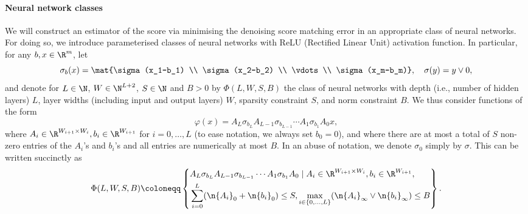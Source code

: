 \documentclass[a4paper, 11pt, headings = small, abstract]{scrartcl}
\begin{document}
\paragraph{Neural network classes} 
We will construct an estimator of the score via minimising the denoising score matching error in an appropriate class of neural networks. For doing so, we introduce  parameterised classes of neural networks with ReLU (Rectified Linear Unit) activation function. 
In particular, for any $b, x\in\R^m$, let
\[
	\sigma_b(x)
	=\mat{\sigma(x_1-b_1) \\ \sigma(x_2-b_2) \\ \vdots \\ \sigma(x_m-b_m)},\quad \sigma(y)=y\vee0,
\]
and denote for $L\in\N$, $W\in\N^{L+2}$, $S\in\N$ and $B>0$ by $\Phi(L, W, S, B)$ the class of neural networks with depth (i.e., number of hidden layers) $L$, layer widths (including input and output layers) $W$, sparsity constraint $S$, and norm constraint $B$.
We thus consider functions of the form
\[
	\varphi(x)
	=A_L\sigma_{b_L}A_{L-1}\sigma_{b_{L-1}}\cdots A_1\sigma_{b_1}A_0x,
\]
where $A_i\in\R^{W_{i+1}\times W_{i}},b_i\in\R^{W_{i+1}}$ for $i=0,\ldots,L$ (to ease notation, we always set $b_0=0$), and where there are at most a total of $S$ non-zero entries of the $A_i$'s and $b_i$'s and all entries are numerically at most $B$.
In an abuse of notation, we denote $\sigma_{0}$ simply by $\sigma$.
This can be written succinctly as
\[
	\Phi(L, W, S, B)
	\coloneqq\left\{
	\begin{aligned}
		&A_L\sigma_{b_L}A_{L-1}\sigma_{b_{L-1}}\cdots A_1\sigma_{b_1}A_0\mid A_i\in\R^{W_{i+1}\times W_i}, b_i\in\R^{W_{i+1}}, \\
		&\sum_{i=0}^L(\n{A_i}_0+\n{b_i}_0)\le S,\max_{i\in\{0, \ldots, L\}}(\n{A_i}_\infty\vee\n{b_i}_\infty)\le B
	\end{aligned}
	\right\}.
\]
\end{document}
